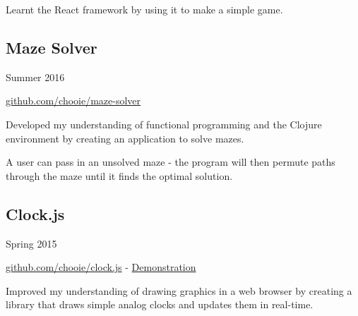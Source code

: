 {\small Learnt the React framework by using it to make a simple game. }

\vspace{1em}
\noindent\begin{minipage}[b]{0.8\textwidth}
  \subsection*{Maze Solver}
\end{minipage}
\noindent\begin{minipage}[b]{0.2\textwidth}
  \flushright
  Summer 2016
\end{minipage}

\href{https://github.com/chooie/maze-solver} {github.com/chooie/maze-solver}

{\small Developed my understanding of functional programming and the Clojure
  environment by creating an application to solve mazes.

  A user can pass in an unsolved maze - the program will then permute paths
  through the maze until it finds the optimal solution. }

\vspace{1em}
\noindent\begin{minipage}[b]{0.8\textwidth}
  \subsection*{Clock.js}
\end{minipage}
\noindent\begin{minipage}[b]{0.2\textwidth}
  \flushright
  Spring 2015
\end{minipage}

\href{https://github.com/chooie/clock.js} {github.com/chooie/clock.js} -
\href {https://chooie.github.io/clock.js} {Demonstration}

{\small Improved my understanding of drawing graphics in a web browser by
  creating a library that draws simple analog clocks and updates them in
  real-time. }

